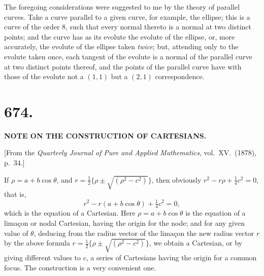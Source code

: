 \documentclass[11pt,a4paper]{article}
\begin{document}
\medskip

The foregoing considerations were suggested to me by the theory of parallel curves. Take a curve parallel to a given curve, for example, the ellipse; this is a curve of the order $8$, such that every normal thereto is a normal at two distinct points; and the curve has as its evolute the evolute of the ellipse, or, more accurately, the evolute of the ellipse taken \emph{twice}; but, attending only to the evolute taken once, each tangent of the evolute is a normal of the parallel curve at two distinct points thereof, and the points of the parallel curve have with those of the evolute not a $(1, 1)$ but a $(2, 1)$ correspondence.

\newpage



\section*{674.}

\begin{center}
\textbf{NOTE ON THE CONSTRUCTION OF CARTESIANS.}
\end{center}

\medskip

\begin{center}
[From the \emph{Quarterly Journal of Pure and Applied Mathematics}, vol.~XV.\ (1878), p.~34.]
\end{center}

\medskip

\noindent If $\rho = a + b\cos\theta$, and $r = \tfrac{1}{2}\{\rho \pm \sqrt{(\rho^{2} - c^{2})}\}$, then obviously $r^{2} - r\rho + \tfrac{1}{4}c^{2} = 0$, that is,
\[
r^{2} - r(a + b\cos\theta) + \tfrac{1}{4}c^{2} = 0,
\]
which is the equation of a Cartesian. Here $\rho = a + b\cos\theta$ is the equation of a lima\c{c}on or nodal Cartesian, having the origin for the node; and for any given value of $\theta$, deducing from the radius vector of the lima\c{c}on the new radius vector $r$ by the above formula $r = \tfrac{1}{2}\{\rho \pm \sqrt{(\rho^{2} - c^{2})}\}$, we obtain a Cartesian, or by giving different values to $c$, a series of Cartesians having the origin for a common focus. The construction is a very convenient one.

\newpage
\end{document}
